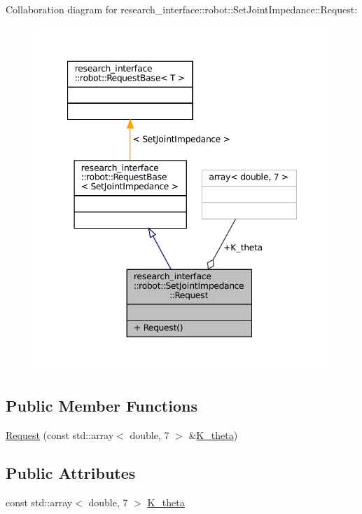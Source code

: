 Collaboration diagram for research\+\_\+interface\+:\+:robot\+:\+:Set\+Joint\+Impedance\+:\+:Request\+:
\nopagebreak
\begin{figure}[H]
\begin{center}
\leavevmode
\includegraphics[width=347pt]{structresearch__interface_1_1robot_1_1SetJointImpedance_1_1Request__coll__graph}
\end{center}
\end{figure}
\subsection*{Public Member Functions}
\begin{DoxyCompactItemize}
\item 
\hyperlink{structresearch__interface_1_1robot_1_1SetJointImpedance_1_1Request_a51361f70687082310939a8053d34b672}{Request} (const std\+::array$<$ double, 7 $>$ \&\hyperlink{structresearch__interface_1_1robot_1_1SetJointImpedance_1_1Request_a53b9599b97baef77378104468ffd0bbf}{K\+\_\+theta})
\end{DoxyCompactItemize}
\subsection*{Public Attributes}
\begin{DoxyCompactItemize}
\item 
const std\+::array$<$ double, 7 $>$ \hyperlink{structresearch__interface_1_1robot_1_1SetJointImpedance_1_1Request_a53b9599b97baef77378104468ffd0bbf}{K\+\_\+theta}
\end{DoxyCompactItemize}


